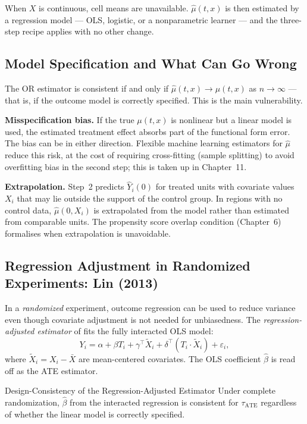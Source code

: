 \documentclass[master.tex]{subfiles}
\begin{document}
\noindent When $X$ is continuous, cell means are unavailable.
$\hat\mu(t,x)$ is then estimated by a regression model --- OLS,
logistic, or a nonparametric learner --- and the three-step recipe
applies with no other change.

\subsection{Model Specification and What Can Go Wrong}

The OR estimator is consistent if and only if $\hat\mu(t,x) \to
\mu(t,x)$ as $n \to \infty$ --- that is, if the outcome model is
correctly specified.  This is the main vulnerability.

\medskip\noindent\textbf{Misspecification bias.}  If the true
$\mu(t,x)$ is nonlinear but a linear model is used, the estimated
treatment effect absorbs part of the functional form error.  The bias
can be in either direction.  Flexible machine learning estimators for
$\hat\mu$ reduce this risk, at the cost of requiring cross-fitting
(sample splitting) to avoid overfitting bias in the second step; this
is taken up in Chapter~11.

\medskip\noindent\textbf{Extrapolation.}  Step~2 predicts
$\hat{Y}_i(0)$ for treated units with covariate values $X_i$ that may
lie outside the support of the control group.  In regions with no
control data, $\hat\mu(0, X_i)$ is extrapolated from the model rather
than estimated from comparable units.  The propensity score overlap
condition (Chapter~6) formalises when extrapolation is unavoidable.

\subsection{Regression Adjustment in Randomized Experiments: Lin (2013)}

In a \emph{randomized} experiment, outcome regression can be used to
reduce variance even though covariate adjustment is not needed for
unbiasedness.  The \emph{regression-adjusted estimator} of
\citet{lin2013agnostic} fits the fully interacted OLS model:
\[
  Y_i = \alpha + \beta T_i + \gamma^\top \tilde{X}_i
        + \delta^\top (T_i \cdot \tilde{X}_i) + \varepsilon_i,
\]
where $\tilde{X}_i = X_i - \bar{X}$ are mean-centered covariates.  The
OLS coefficient $\hat\beta$ is read off as the ATE estimator.

\begin{thm}{Design-Consistency of the Regression-Adjusted Estimator \citep{lin2013agnostic}}
\label{w5:prop:lin}
Under complete randomization, $\hat\beta$ from the interacted
regression is consistent for $\tau_{\mathrm{ATE}}$ regardless of
whether the linear model is correctly specified.
\end{thm}
\end{document}
